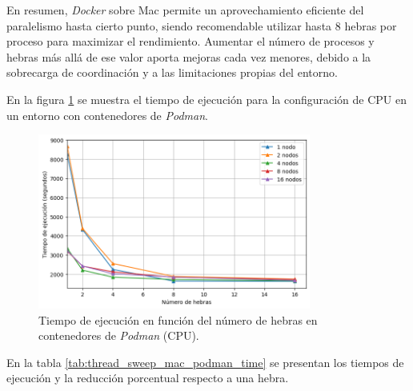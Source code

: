 En resumen, \textit{Docker} sobre Mac permite un aprovechamiento eficiente del paralelismo hasta cierto punto, siendo recomendable utilizar hasta 8 hebras por proceso para maximizar el rendimiento. Aumentar el número de procesos y hebras más allá de ese valor aporta mejoras cada vez menores, debido a la sobrecarga de coordinación y a las limitaciones propias del entorno.

En la figura \ref{fig:thread_sweep_mac_podman_time} se muestra el tiempo de ejecución para la configuración de CPU en un entorno con contenedores de \textit{Podman}.

\begin{figure}[H]
    \centering
    \includegraphics[width=0.8\textwidth]{imagenes/cap5/thread_sweep_mac_podman_time.png}
    \caption{Tiempo de ejecución en función del número de hebras en contenedores de \textit{Podman} (CPU).}
    \label{fig:thread_sweep_mac_podman_time}
\end{figure}

En la tabla \ref{tab:thread_sweep_mac_podman_time} se presentan los tiempos de ejecución y la reducción porcentual respecto a una hebra.

